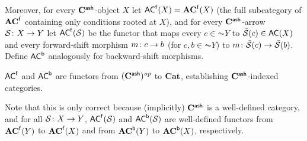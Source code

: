 Moreover, for every $\mathbf{C}^{\mathsf{ash}}$-object $X$ let $\mathsf{AC}^{\mathsf{f}}(X)=\mathbf{AC}^{\mathsf{f}}(X)$ (the full subcategory of $\mathbf{AC}^{\mathsf{f}}$ containing only conditions rooted at $X$), and for every $\mathbf{C}^{\mathsf{ash}}$-arrow $\mathcal{S}\colon X\rightarrow Y$ let $\mathsf{AC}^{\mathsf{f}}(\mathcal{S})$ be the functor that maps every $c\in \AC Y$ to $\bar\cS(c)\in \AC X$ and every forward-shift morphism $m\colon c\rightarrow b$ (for $c,b\in \AC Y$) to $m\colon \bar{\mathcal{S}}(c)\rightarrow \bar{\mathcal{S}}(b)$. Define $\mathsf{AC}^{\mathsf{b}}$ analogously for backward-shift morphisms.

\begin{proposition}
$\mathsf{AC}^{\mathsf{f}}$ and $\mathsf{AC}^{\mathsf{b}}$ are functors from $(\mathbf{C}^{\mathsf{ash}})^{\mathit{op}}$ to $\mathbf{Cat}$, establishing $\mathbf{C}^{\mathsf{ash}}$-indexed categories.
\end{proposition}
%
Note that this is only correct because (implicitly) $\mathbf{C}^{\mathsf{ash}}$ is a well-defined category, and for all $\mathcal{S}\colon X\rightarrow Y$, $\mathsf{AC}^{\mathsf{f}}(\mathcal{S})$ and $\mathsf{AC}^{\mathsf{b}}(\mathcal{S})$ are well-defined functors from $\mathbf{AC}^{\mathsf{f}}(Y)$ to $\mathbf{AC}^{\mathsf{f}}(X)$ and from $\mathbf{AC}^{\mathsf{b}}(Y)$ to $\mathbf{AC}^{\mathsf{b}}(X)$, respectively.
